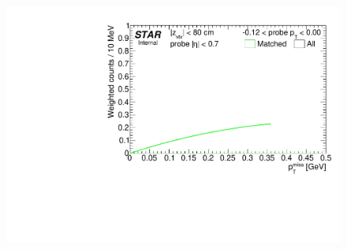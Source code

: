 \begin{figure}[ht]
{  \includegraphics[width=\linewidth,page=9]{graphics/systematicsEfficiency/TOF_tagAndProbe/Fitting_effVsPt_mc.CPT.pdf}
}%
\end{figure}
